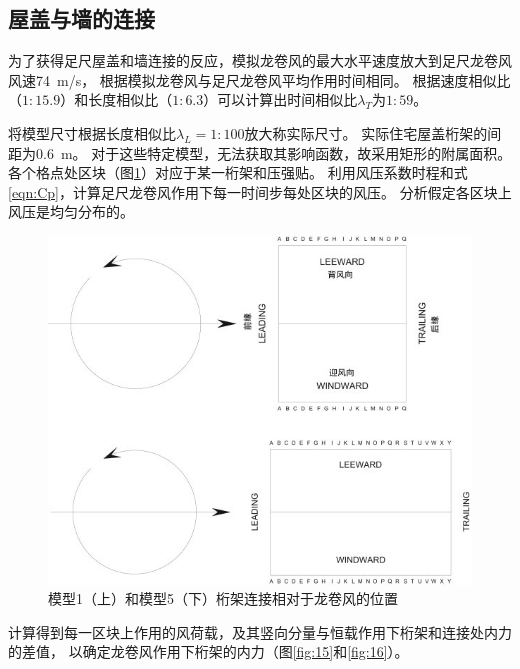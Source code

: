 \documentclass{ctexart}
\begin{document}
\subsection{屋盖与墙的连接}
为了获得足尺屋盖和墙连接的反应，模拟龙卷风的最大水平速度放大到足尺龙卷风风速\SI{74}{m/s}，
根据模拟龙卷风与足尺龙卷风平均作用时间相同。
根据速度相似比（$1:15.9$）和长度相似比（$1:6.3$）可以计算出时间相似比$\lambda_T$为$1:59$。

将模型尺寸根据长度相似比$\lambda_L=1:100$放大称实际尺寸。
实际住宅屋盖桁架的间距为\SI{0.6}{m}。
对于这些特定模型，无法获取其影响函数，故采用矩形的附属面积。
各个格点处区块（图\ref{fig:14}）对应于某一桁架和压强贴。
利用风压系数时程和式\ref{eqn:Cp}，计算足尺龙卷风作用下每一时间步每处区块的风压。
分析假定各区块上风压是均匀分布的。

\begin{figure}
\centering
\includegraphics{./fig/14.jpg}
\caption{模型1（上）和模型5（下）桁架连接相对于龙卷风的位置}
\label{fig:14}
\end{figure}


计算得到每一区块上作用的风荷载，及其竖向分量与恒载作用下桁架和连接处内力的差值，
以确定龙卷风作用下桁架的内力（图\ref{fig:15}和\ref{fig:16}）。
\end{document}
